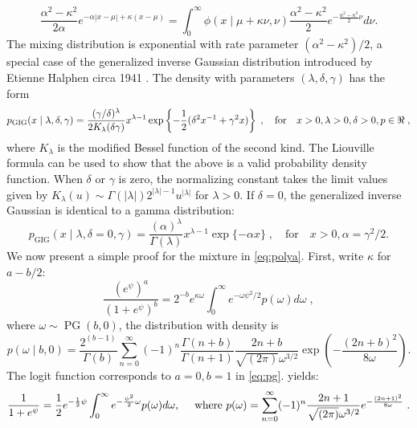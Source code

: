 \documentclass[lineno]{biometrika}
\begin{document}
\begin{equation*}
  \frac{\alpha^2-\kappa^2}{2\alpha} e^{-\alpha|x-\mu| + \kappa(x-\mu)} 
  = \int_0^{\infty} \phi(x \mid \mu + \kappa \nu, \nu) 
  \frac{\alpha^2-\kappa^2}{2} e^{-\frac{\alpha^2-\kappa^2}{2} \nu} d \nu. 
\end{equation*}
The mixing distribution is exponential with rate parameter
$(\alpha^2-\kappa^2)/2$, a special case of the generalized inverse Gaussian
distribution introduced by Etienne Halphen circa 1941
\citep{seshadri1997halphen}.  The density with parameters $(\lambda, \delta, \gamma)$ 
has the form 
\begin{equation*}
  p_{\mathrm{GIG}}(x \mid \lambda, \delta, \gamma) = 
  \frac{(\gamma/\delta)^{\lambda}}{2K_{\lambda}(\delta \gamma)} x^{\lambda-1} 
  \exp\left\{ -\half (\delta^2 x^{-1} + \gamma^2 x )  \right\}
  \;, 
  \quad\text{for}\quad x > 0, \lambda >0, \delta > 0,  p \in \Re
  \;,
\end{equation*}
where $K_{\lambda}$ is the modified Bessel function of the second kind.  The
Liouville formula can be used to show that the above is a valid probability density
function.  When $\delta$ or $\gamma$ is zero, the normalizing constant takes 
the limit values given by
$K_{\lambda}(u) \sim \Gamma(|\lambda|) 2^{|\lambda|-1} u^{|\lambda|}$ 
for $\lambda > 0$.  If $\delta=0$, the generalized
inverse Gaussian is identical to a gamma distribution:
$$
p_{\mathrm{GIG}}(x \mid \lambda, \delta = 0 , \gamma) 
= \frac{(\alpha)^{\lambda}}{\Gamma(\lambda)} x^{\lambda-1} \exp\{ -\alpha x \}
\;, \quad\text{for}\quad x > 0, \alpha = \gamma^2 / 2.
$$
%
We now present a simple proof for the \PG{} mixture in \eqref{eq:polya}. 
First, write $\kappa$ for $a-b/2$: 
\begin{equation}
  \frac{(e^{\psi})^a}{(1+e^{\psi})^b} = 2^{-b} e^{\kappa \omega} \int_0^{\infty} 
  e^{-\omega \psi^2/2} p(\omega) d\omega
  \;, 
  \label{eq:pg}
\end{equation}
where $\omega \sim \operatorname{PG}(b,0)$, the \PG{} distribution with density is
$$
p(\omega \mid b, 0) = \frac{2^{(b-1)}}{\Gamma(b)} 
\sum_{n=0}^{\infty} (-1)^n \frac{\Gamma(n+b)}{\Gamma(n+1)} 
\frac{2n+b}{\sqrt{(2\pi)} \omega^{3/2}} 
\exp\left(-\frac{(2n + b)^2}{8 \omega} \right).
$$
The logit function corresponds to $a=0,b=1$ in \eqref{eq:pg}. \CS{} yields:  
\begin{equation}
  \frac{1}{1+e^{\psi}} = \half e^{-\half \psi} \int_0^{\infty} 
  e^{-\frac{\psi^2}{2} \omega} p(\omega) d\omega,
  \quad \text{ where } 
  p(\omega) = \sum_{n=0}^{\infty} (-1)^n \frac{2n+1}{\sqrt{(2\pi)} \omega^{3/2}} 
  e^{-\frac{(2n+1)^2}{8\omega}}
  \label{eq:logit}
  \;.
\end{equation}
\end{document}
